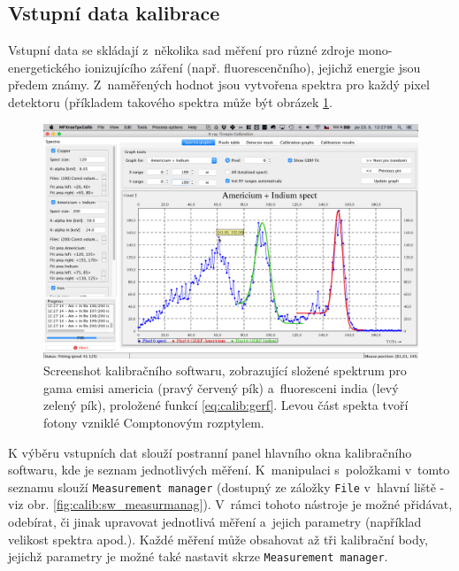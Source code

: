 \subsection{Vstupní data kalibrace}
Vstupní data se skládají z~několika sad měření pro různé zdroje mono-energetického ionizujícího záření (např. fluorescenčního), jejichž energie jsou předem známy. Z~naměřených hodnot jsou vytvořena spektra pro každý pixel detektoru (příkladem takového spektra může být obrázek \ref{fig:calib:sw_spektra}.%

\begin{figure}[t]
	\begin{center}
		\includegraphics[width=15cm]{figures/calibsw_spectra_all.png}
		\caption{Screenshot kalibračního softwaru, zobrazující složené spektrum pro gama emisi americia (pravý červený pík) a~fluoresceni india (levý zelený pík), proložené funkcí \ref{eq:calib:gerf}. Levou část spekta tvoří fotony vzniklé Comptonovým rozptylem.}
		\label{fig:calib:sw_spektra}
	\end{center}
\end{figure}

K výběru vstupních dat slouží postranní panel hlavního okna kalibračního softwaru, kde je seznam jednotlivých měření. K~manipulaci s~položkami v~tomto seznamu slouží \texttt{Measurement manager} (dostupný ze záložky \texttt{File} v~hlavní liště - viz obr. \ref{fig:calib:sw_measurmanag}). V~rámci tohoto nástroje je možné přidávat, odebírat, či jinak upravovat jednotlivá měření a~jejich parametry (například velikost spektra apod.). Každé měření může obsahovat až tři kalibrační body, jejichž parametry je možné také nastavit skrze \texttt{Measurement manager}.

